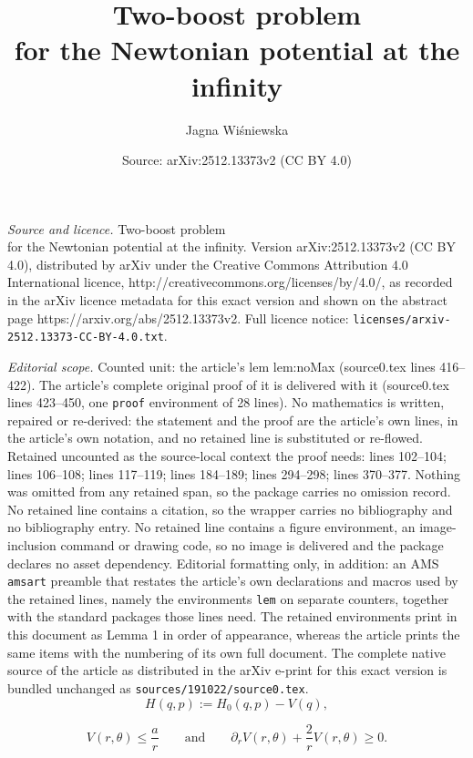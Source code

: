 \documentclass[10pt,a4paper]{amsart}
\title{Two-boost problem\\ for the Newtonian potential at the infinity}
\author{Jagna Wi\'sniewska}
\date{Source: arXiv:2512.13373v2 (CC BY 4.0)}
\begin{document}
\maketitle

\noindent\emph{Source and licence.} Two-boost problem\\ for the Newtonian potential at the infinity. Version arXiv:2512.13373v2 (CC BY 4.0), distributed by arXiv under the Creative Commons Attribution 4.0 International licence, http://creativecommons.org/licenses/by/4.0/, as recorded in the arXiv licence metadata for this exact version and shown on the abstract page https://arxiv.org/abs/2512.13373v2. Full licence notice: \texttt{licenses/arxiv-2512.13373-CC-BY-4.0.txt}.\par\smallskip

\noindent\textit{Editorial scope.} Counted unit: the article's lem lem:noMax (source0.tex lines 416--422). The article's complete original proof of it is delivered with it (source0.tex lines 423--450, one \texttt{proof} environment of 28 lines). No mathematics is written, repaired or re-derived: the statement and the proof are the article's own lines, in the article's own notation, and no retained line is substituted or re-flowed.  Retained uncounted as the source-local context the proof needs: lines 102--104; lines 106--108; lines 117--119; lines 184--189; lines 294--298; lines 370--377.  Nothing was omitted from any retained span, so the package carries no omission record.  No retained line contains a citation, so the wrapper carries no bibliography and no bibliography entry.  No retained line contains a figure environment, an image-inclusion command or drawing code, so no image is delivered and the package declares no asset dependency.  Editorial formatting only, in addition: an AMS \texttt{amsart} preamble that restates the article's own declarations and macros used by the retained lines, namely the environments \texttt{lem} on separate counters, together with the standard packages those lines need.  The retained environments print in this document as Lemma 1 in order of appearance, whereas the article prints the same items with the numbering of its own full document.  The complete native source of the article as distributed in the arXiv e-print for this exact version is bundled unchanged as \texttt{sources/191022/source0.tex}.
\begin{equation}\label{DefH}
H(q,p):= H_0(q,p) - V(q),
\end{equation}

\begin{equation}\label{DefV}
V(r, \theta) \leq \frac{a}{r}\qquad\textrm{and}\qquad \partial_r V(r,\theta) +\frac{2}{r}V(r,\theta)\geq 0.
\end{equation}
\end{document}
